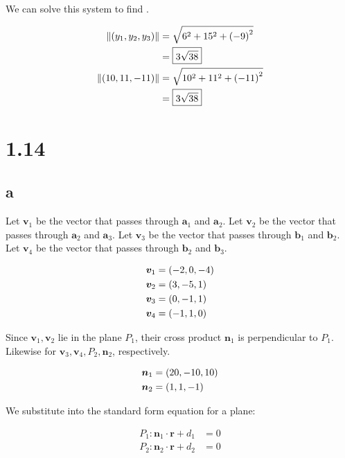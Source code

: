 \documentclass{article}
\begin{document}
We can solve this system to find .

\begin{align*}
  \left\lVert\left ( y_1, y_2, y_3 \right)\right\rVert &= \sqrt{6^2 + 15^2 + \left ( -9 \right)^2} \\
                              &= \boxed{3 \sqrt{38}} \\
  \left\lVert\left ( 10, 11, -11 \right)\right\rVert &= \sqrt{10^2 + 11^2 + \left ( -11 \right)^2} \\
  &= \boxed{3 \sqrt{38}} \\
\end{align*}



\section*{1.14}


\subsection*{a}

Let $\bm{v}_1$ be the vector that passes through $\bm{a}_1$ and $\bm{a}_2$.
Let $\bm{v}_2$ be the vector that passes through $\bm{a}_2$ and $\bm{a}_3$.
Let $\bm{v}_3$ be the vector that passes through $\bm{b}_1$ and $\bm{b}_2$.
Let $\bm{v}_4$ be the vector that passes through $\bm{b}_2$ and $\bm{b}_3$.

\begin{align*}
  \bm{v}_1 &= \left ( -2, 0, -4 \right) \\
  \bm{v}_2 &= \left ( 3, -5, 1 \right) \\
  \bm{v}_3 &= \left ( 0, -1, 1 \right) \\
  \bm{v}_4 &= \left ( -1, 1, 0 \right) \\
\end{align*}

Since $\bm{v}_1, \bm{v}_2$ lie in the plane $P_1$, their cross product $\bm{n}_1$ is perpendicular to $P_1$.
Likewise for $\bm{v}_3, \bm{v}_4, P_2, \bm{n}_2$, respectively.

\begin{align*}
  \bm{n}_1 &= \left ( 20, -10, 10 \right) \\
  \bm{n}_2 &= \left ( 1, 1, -1 \right) \\
\end{align*}

We substitute into the standard form equation for a plane:

\begin{align*}
  P_1 : \bm{n}_1 \cdot \bm{r} + d_1 &= 0 \\
  P_2 : \bm{n}_2 \cdot \bm{r} + d_2 &= 0 \\
\end{align*}
\end{document}
